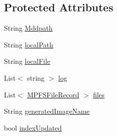 \subsection*{Protected Attributes}
\begin{DoxyCompactItemize}
\item 
String \hyperlink{class_microchip_1_1_m_p_f_s_builder_a62437d97e6140d62bcdb357ca9a3d10e}{Mddpath}
\item 
String \hyperlink{class_microchip_1_1_m_p_f_s_builder_a50bcab31eeaf73bd5975d595d2bbe8cf}{local\+Path}
\item 
String \hyperlink{class_microchip_1_1_m_p_f_s_builder_ab110f2474a6be5f43ee032058d6ddd65}{local\+File}
\item 
List$<$ string $>$ \hyperlink{class_microchip_1_1_m_p_f_s_builder_a31a8312feb632071ed26469c2f3b0591}{log}
\item 
List$<$ \hyperlink{class_microchip_1_1_m_p_f_s_file_record}{M\+P\+F\+S\+File\+Record} $>$ \hyperlink{class_microchip_1_1_m_p_f_s_builder_a7bf6578967afbe6305c4301b7161822d}{files}
\item 
String \hyperlink{class_microchip_1_1_m_p_f_s_builder_af35e78a632fd4f732c2b79b4d70992a5}{generated\+Image\+Name}
\item 
bool \hyperlink{class_microchip_1_1_m_p_f_s_builder_a506e41c5901bcb099779d8addeb42fe4}{index\+Updated}
\end{DoxyCompactItemize}
